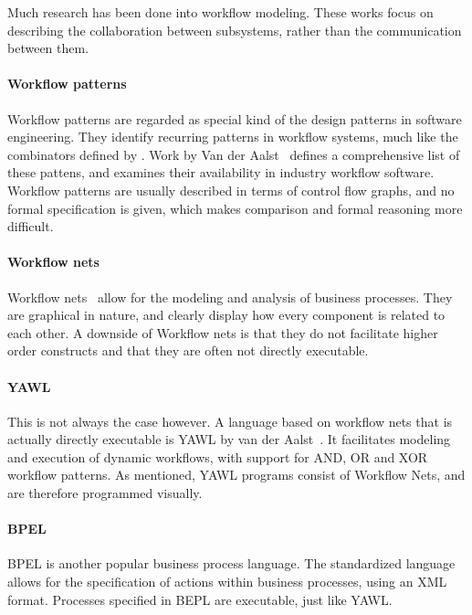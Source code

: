 Much research has been done into workflow modeling. These works focus on
describing the collaboration between subsystems, rather than the communication
between them.

\paragraph{Workflow patterns}

Workflow patterns are regarded as special kind of the design patterns in
software engineering. They identify recurring patterns in workflow systems, much
like the combinators defined by \TOPHAT. Work by Van der
Aalst~\cite{journals/dpd/AalstHKB03} defines a comprehensive list of these
pattens, and examines their availability in industry workflow software.
Workflow patterns are usually described in terms of control flow graphs, and no
formal specification is given, which makes comparison and formal reasoning more
difficult.

\paragraph{Workflow nets}

Workflow nets~\cite{journals/jcsc/Aalst98} allow for the modeling and analysis
of business processes. They are graphical in nature, and clearly display how
every component is related to each other. A downside of Workflow nets is that
they do not facilitate higher order constructs and that they are often not
directly executable.

\paragraph{YAWL}

This is not always the case however. A language based on workflow nets that is
actually directly executable is YAWL by van der
Aalst~\cite{DBLP:journals/is/AalstH05}. It facilitates modeling and execution of
dynamic workflows, with support for AND, OR and XOR workflow patterns. As
mentioned, YAWL programs consist of Workflow Nets, and are therefore programmed
visually.

\paragraph{BPEL}

BPEL is another popular business process language. The standardized
language allows for the specification of actions within business processes,
using an XML format. Processes specified in BEPL are executable, just like YAWL.


